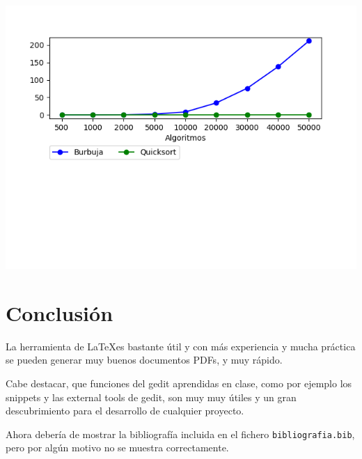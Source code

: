 \documentclass[a4,12pt]{article}
\begin{document}
\begin{center}
\includegraphics[width=1\textwidth]{Comparativa/Comparacion.png}
\end{center}

\newpage
\section{Conclusión}
La herramienta de \LaTeX es bastante útil y con más experiencia y mucha práctica se pueden generar muy buenos documentos PDFs, y muy rápido.

Cabe destacar, que funciones del gedit aprendidas en clase, como por ejemplo los snippets y las external tools de gedit, son muy muy útiles y un gran descubrimiento para el desarrollo de cualquier proyecto.

\bigskip
Ahora debería de mostrar la bibliografía incluida en el fichero \texttt{bibliografia.bib}, pero por algún motivo no se muestra correctamente.
{}

\end{document}
